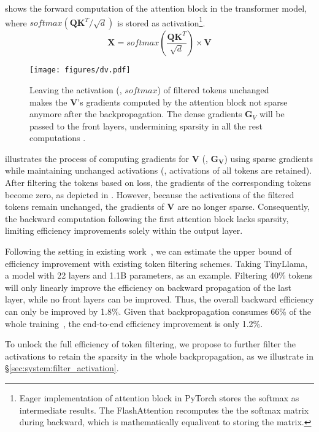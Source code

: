  shows the forward computation of the attention block in the transformer model, where $softmax(\mathbf{Q}\mathbf{K}^T/\sqrt{d})$ is stored as activation\footnote{Eager implementation of attention block in PyTorch stores the softmax as intermediate results. The FlashAttention recomputes the the softmax matrix during backward, which is mathematically equalivent to storing the matrix.}.
\begin{equation} \label{eq:attention}
	\mathbf{X} = softmax(\frac{\mathbf{Q}\mathbf{K}^T}{\sqrt{d}}) \times \mathbf{V}
\end{equation}
\begin{figure}[t]
	\centering
	\texttt{[image: figures/dv.pdf]}
	\vspace{+0.5mm}
	\caption{Leaving the activation (\ie, $softmax$) of filtered tokens unchanged makes the $\mathbf{V}$'s gradients computed by the attention block not sparse anymore after the backpropagation. The dense gradients $\mathbf{G}_V$ will be passed to the front layers, undermining sparsity in all the rest computations .}
	\label{fig:dv}
    \vspace{+1mm}
\end{figure}
 illustrates the process of computing gradients for $\mathbf{V}$ (\ie, $\mathbf{G_V}$) using sparse gradients while maintaining unchanged activations (\ie, activations of all tokens are retained). After filtering the tokens based on loss, the gradients of the corresponding tokens become zero, as depicted in . However, because the activations of the filtered tokens remain unchanged, the gradients of $\mathbf{V}$ are no longer sparse. Consequently, the backward computation following the first attention block lacks sparsity, limiting efficiency improvements solely within the output layer.

Following the setting in existing work~\cite{RHO}, we can estimate the upper bound of efficiency improvement with existing token filtering schemes. Taking TinyLlama, a model with 22 layers and 1.1B parameters, as an example. Filtering 40\% tokens will only linearly improve the efficiency on backward propagation of the last layer, while no front layers can be improved. Thus, the overall backward efficiency can only be improved by 1.8\%. Given that backpropagation consumes 66\% of the whole training~\cite{MegatronLM}, the end-to-end efficiency improvement is only 1.2\%.

To unlock the full efficiency of token filtering, we propose to further filter the activations to retain the sparsity in the whole backpropagation, as we illustrate in \S\ref{sec:system:filter_activation}.

